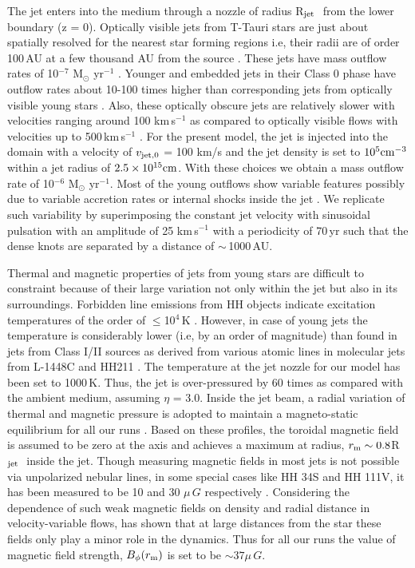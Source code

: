 \documentclass[useAMS,usenatbib]{mn2e}
\newcommand{\rj}{R$_{\rm jet}$}
\begin{document}
The jet enters into the medium through a nozzle of radius \rj\,\,
from the lower boundary (z = 0). Optically visible jets from T-Tauri
stars are just about spatially resolved for the nearest
star forming regions i.e, their radii are of order
100\,AU at a few thousand AU from the source \citep{Ray:2012p15733}.
These jets have mass outflow rates of 10$^{-7}$ M$_{\odot}$
yr$^{-1}$ \citep{Dougados:2010p15774}. Younger and 
embedded jets in their Class 0 phase have
outflow rates about 10-100 times higher than 
corresponding jets from optically visible young stars
\citep{Bally:2007p2340, Dionatos:2009p15670, Ray:2012p15733}. Also,
these optically obscure jets are relatively slower with velocities
ranging around 100 km\,s$^{-1}$ \citep{Bally:2007p2340} as compared to
optically visible flows with velocities up to 500\,km\,s$^{-1}$
\citep[e.g,][]{Mundt:1987p15799}.
For the present model, the jet is injected into the domain with a 
velocity of $v_{\rm jet,0}$ = 100 km/s and the jet density is set to
$10^{5} \rm cm^{-3}$ within a jet radius of $2.5\times10^{15} \rm
cm$. With these choices we obtain a mass outflow rate of 10$^{-6}$
M$_{\odot}$ yr$^{-1}$. Most of the young outflows 
show variable features possibly due to variable accretion rates
or internal shocks inside the jet \citep[e.g.][]{Bachiller:1996p4692}.
We replicate such variability by superimposing the constant jet
velocity with sinusoidal pulsation with an amplitude of 25
km\,s$^{-1}$ with a periodicity of 70\,yr such that the dense knots
are separated by a distance of $\sim$\,1000\,AU.

Thermal and magnetic properties of jets from young stars are difficult
to constraint because of their large variation not only within the jet
but also in its surroundings. Forbidden line emissions from
HH objects indicate excitation temperatures of the order
of $\leq$10$^{4}$\,K \citep{Podio:2006p15921,
  Bally:2007p2340}. However, in case of 
young jets the temperature is
considerably lower (i.e, by an order of magnitude) than found in jets from Class I/II
sources as derived from various atomic lines in molecular jets from
L-1448C and HH211 \citep{Dionatos:2009p15670,Dionatos:2010p15968}.  
The temperature at the jet
nozzle for our model has been set to 1000\,K. Thus, the jet is
over-pressured by 60 times as compared with the ambient medium,
assuming $\eta$ = 3.0. Inside the jet beam, a radial variation of thermal
and magnetic pressure is adopted to maintain a magneto-static
equilibrium for all our runs \citealt{Stone:2000p2650}. 
Based on these profiles, 
the toroidal magnetic field is assumed to be
zero at the axis and achieves a maximum at radius, $r_{\rm m} \sim 0.8$\rj\,\,
inside the jet. Though measuring magnetic fields in
most jets is not possible via unpolarized nebular lines, in some special
cases like HH 34S and HH 111V, it has been measured to be 10 and 30
$\mu\,G$ respectively \citep{Morse:1993p15960}. Considering the
dependence of such weak magnetic fields on density and radial distance in velocity-variable flows, 
\cite{Hartigan:2007p15768} has shown that at large distances from the 
star these fields only play a minor role in the dynamics. Thus for all
our runs the value of magnetic field strength, $B_{\phi}(r_{\rm m})$ 
is set to be $\sim 37\mu\,G$.
%
\end{document}
